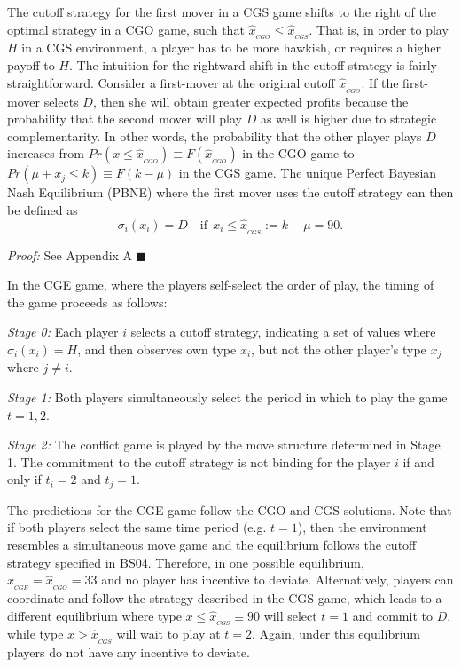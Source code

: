 \documentclass[12pt, letterpaper]{article}
\theoremstyle{plain}
\begin{document}
The cutoff strategy for the first mover in a CGS game shifts to the right of the optimal strategy in a CGO game, such that $\hat{x}_{_{CGO}}\leq\hat{x}_{_{CGS}}$. That is, in order to play $H$ in a CGS environment, a player has to be more hawkish, or requires a higher payoff to $H$. The intuition for the rightward shift in the cutoff strategy is fairly straightforward. Consider a first-mover at the original cutoff $\hat{x}_{_{CGO}}$. If the first-mover selects $D$, then she will obtain greater expected profits because the probability that the second mover will play $D$ as well is higher due to strategic complementarity. In other words, the probability that the other player plays $D$ increases from $Pr(x\leq\hat{x}_{_{CGO}}) \equiv F(\hat{x}_{_{CGO}}) $ in the CGO game to  $Pr(\mu+x_j\leq k) \equiv F(k-\mu)  $ in the CGS game. The unique Perfect Bayesian Nash Equilibrium (PBNE) where the first mover uses the cutoff strategy can then be defined as
\begin{equation}
\sigma_i(x_i)=D \quad \text{if} \ \ x_i\leq \hat{x}_{_{CGS}}:= k-\mu=90. 
\end{equation}

\noindent \textit{Proof:} See Appendix A $\blacksquare$

In the CGE game, where the players self-select the order of play, the timing of the game proceeds as follows:

\textit{Stage 0:} Each player $i$ selects a cutoff strategy, indicating a set of values where $\sigma_i(x_i)=H$, and then observes own type $x_i$, but not the other player's type $x_j$ where $j\neq i$.

 \textit{Stage 1:} Both players simultaneously select the period in which to play the game $t=1,2$. 

\textit{Stage 2:} The conflict game is played by the move structure determined in Stage 1. The commitment to the cutoff strategy is not binding for the player $i$ if and only if $t_i=2$ and $t_j=1$. 

The predictions for the CGE game follow the CGO and CGS solutions. Note that if both players select the same time period (e.g. $t=1$), then the environment resembles a simultaneous move game and the equilibrium follows the cutoff strategy specified in BS04. Therefore, in one possible equilibrium, $\hat{x}_{_{CGE}}=\hat{x}_{_{CGO}}=33$ and no player has incentive to deviate. Alternatively, players can coordinate and follow the strategy described in the CGS game, which leads to a different equilibrium where type $x\leq \hat{x}_{_{CGS}}\equiv 90$ will select $t=1$ and commit to $D$, while type $x>\hat{x}_{_{CGS}}$ will wait to play at $t=2$. Again, under this equilibrium players do not have any incentive to deviate. 
\end{document}
